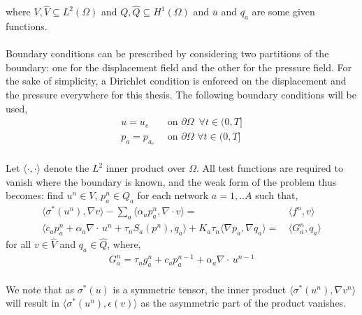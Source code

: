 where $V,\hat{V} \subseteq L^2(\Omega)$ and $Q,\hat{Q} \subseteq H^1(\Omega)$ and $\bar{u}$ and $\bar{q_a}$ are some given functions. 
\\
\\ 
Boundary conditions can be prescribed by considering two partitions of the boundary: one for the displacement field and the other for the pressure field. For the sake of simplicity, a Dirichlet condition is enforced on the displacement and the pressure everywhere for this thesis. The following boundary conditions will be used,
\begin{align}
u =  u_e \,\, & \, \text{on} \, \, \partial \Omega \, \, \, \forall t\in(0,T]\\
p_a = p_{a_e} \,\, & \,\text{on} \, \, \partial \Omega \, \, \forall t\in(0,T]
\end{align}
\\
Let $\langle\cdot, \cdot \rangle$ denote the $L^2$ inner product over $\Omega$. All test functions are required to vanish where the boundary is known, and the weak form of the problem thus becomes: find $u^n \in V$, $p_a^n \in Q_a$ for each network $a=1,..A$ such that, 
\\
\begin{align} \label{mpet_disc1}
\langle \sigma^*(u^n), \nabla v \rangle - \displaystyle\sum_a \langle \alpha_a p_a^n ,\nabla \cdot v \rangle = &\, \langle f^n , v \rangle \\
\langle c_a p_a^{n} + \alpha_a \nabla \cdot \,u^n + \tau_n S_a(p^n),  q_a \rangle + K_a \tau_n\langle \nabla p_a, \nabla q_a\rangle  = & \, \langle G_a^n, q_a\rangle \label{mpet_disc2}
\end{align}
for all $v \in \hat{V}$ and $q_a \in \hat{Q}$, where,
\begin{align} \label{G_source}
G_a^n = \tau_n g_a^n + c_a p_a^{n-1} + \alpha_a \nabla \cdot \, u^{n-1}
\end{align}
\\
We note that as $\sigma^*(u)$ is a symmetric tensor, the inner product $\langle \sigma^*(u^n), \nabla  v^n \rangle$ will result in $\langle \sigma^*(u^n), \epsilon(v) \rangle$ as the asymmetric part of the product vanishes.
